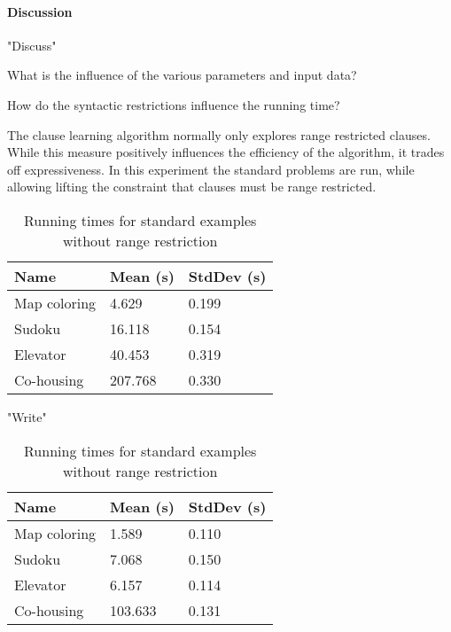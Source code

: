 
\paragraph{Discussion}
"Discuss"

\begin{question}
	What is the influence of the various parameters and input data?
\end{question}


\begin{question}
	How do the syntactic restrictions influence the running time?
\end{question}

\begin{experiment}
	The clause learning algorithm normally only explores range restricted clauses.
	While this measure positively influences the efficiency of the algorithm, it trades off expressiveness.
	In this experiment the standard problems are run, while allowing lifting the constraint that clauses must be range restricted.

	\begin{table}[!htp]
		\begin{tabularx}{\textwidth}{XXX}
			\textbf{Name}	& \textbf{Mean (s)}	& \textbf{StdDev (s)} \\
			\toprule
			Map coloring 	& 4.629				& 0.199 \\
			Sudoku 			& 16.118			& 0.154 \\
			Elevator 		& 40.453 			& 0.319 \\
			Co-housing 		& 207.768			& 0.330
		\end{tabularx}
		\label{tbl:exp_speed_standard}
		\caption{Running times for standard examples without range restriction}
	\end{table}

\end{experiment}

\begin{experiment}
	"Write"

	\begin{table}[!htp]
		\begin{tabularx}{\textwidth}{XXX}
			\textbf{Name}	& \textbf{Mean (s)}	& \textbf{StdDev (s)} \\
			\toprule
			Map coloring 	& 1.589				& 0.110 \\
			Sudoku 			& 7.068				& 0.150 \\
			Elevator 		& 6.157 			& 0.114 \\
			Co-housing 		& 103.633			& 0.131
		\end{tabularx}
		\label{tbl:exp_speed_standard}
		\caption{Running times for standard examples without range restriction}
	\end{table}

\end{experiment}

